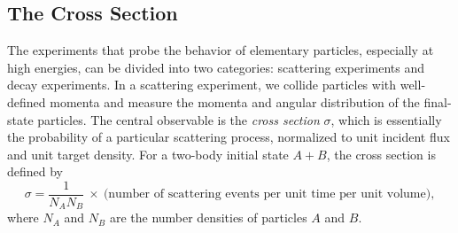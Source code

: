 \subsection{The Cross Section}

The experiments that probe the behavior of elementary particles, especially
at high energies, can be divided into two categories: scattering experiments
and decay experiments.  In a scattering experiment, we collide particles with
well-defined momenta and measure the momenta and angular distribution of the
final-state particles.  The central observable is the \emph{cross section}
$\sigma$, which is essentially the probability of a particular scattering
process, normalized to unit incident flux and unit target density.  For a
two-body initial state $A+B$, the cross section is defined by
\begin{equation}
  \sigma = \frac{1}{N_A N_B}\ \times\ \text{(number of scattering events per
    unit time per unit volume)} ,
  \label{eq:4.59}
\end{equation}
where $N_A$ and $N_B$ are the number densities of particles $A$ and $B$.


